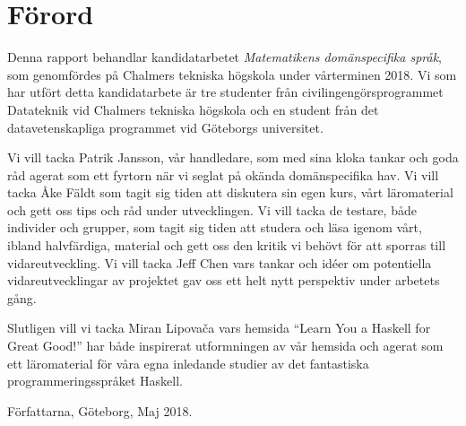 \thispagestyle{plain}			%
\section*{Förord}

Denna rapport behandlar kandidatarbetet \textit{Matematikens domänspecifika språk},
som genomfördes på Chalmers tekniska högskola under vårterminen 2018. Vi som har
utfört detta kandidatarbete är tre studenter från civilingengörsprogrammet
Datateknik vid Chalmers tekniska högskola och en student från det
datavetenskapliga programmet vid Göteborgs universitet.

Vi vill tacka Patrik Jansson, vår handledare, som med sina kloka tankar och goda
råd agerat som ett fyrtorn när vi seglat på okända domänspecifika hav. Vi vill
tacka Åke Fäldt som tagit sig tiden att diskutera sin egen kurs, vårt
läromaterial och gett oss tips och råd under utvecklingen. Vi vill tacka de
testare, både individer och grupper, som tagit sig tiden att studera och läsa
igenom vårt, ibland halvfärdiga, material och gett oss den kritik vi behövt för
att sporras till vidareutveckling. Vi vill tacka Jeff Chen vars tankar och idéer
om potentiella vidareutvecklingar av projektet gav oss ett helt nytt perspektiv
under arbetets gång.

Slutligen vill vi tacka Miran Lipovača vars hemsida ``Learn You a
Haskell for Great Good!'' har både inspirerat utformningen av vår hemsida och
agerat som ett läromaterial för våra egna inledande studier av det fantastiska
programmeringsspråket Haskell. 

\vspace{1.5cm}
\hfill
Författarna, Göteborg, Maj 2018.

\newpage				%
\thispagestyle{empty}
\mbox{}
